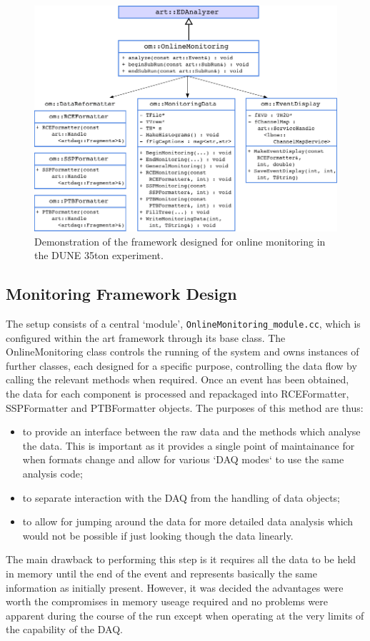 \begin{figure}[ht]
  \centering
  \includegraphics[width=12cm]{onlineMonitoringFramework.png}
  \caption{Demonstration of the framework designed for online monitoring in the DUNE 35ton experiment.}
  \label{fig:OnlineMonitoringFramework}
\end{figure}

\subsection{Monitoring Framework Design}\label{sec:MonitoringFrameworkDesign}

The setup consists of a central `module', \texttt{OnlineMonitoring\_module.cc}, which is configured within the art framework through its base class.  The OnlineMonitoring class controls the running of the system and owns instances of further classes, each designed for a specific purpose, controlling the data flow by calling the relevant methods when required.  Once an event has been obtained, the data for each component is processed and repackaged into RCEFormatter, SSPFormatter and PTBFormatter objects.  The purposes of this method are thus:
\begin{itemize}
\item to provide an interface between the raw data and the methods which analyse the data.  This is important as it provides a single point of maintainance for when formats change and allow for various `DAQ modes` to use the same analysis code;
\item to separate interaction with the DAQ from the handling of data objects;
\item to allow for jumping around the data for more detailed data analysis which would not be possible if just looking though the data linearly.
\end{itemize}
The main drawback to performing this step is it requires all the data to be held in memory until the end of the event and represents basically the same information as initially present.  However, it was decided the advantages were worth the compromises in memory useage required and no problems were apparent during the course of the run except when operating at the very limits of the capability of the DAQ.

